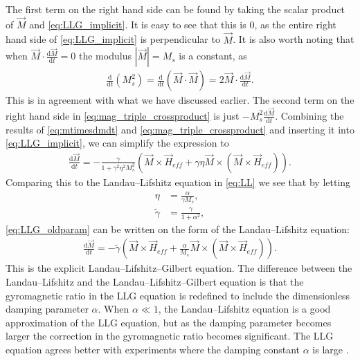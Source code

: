 \documentclass[12pt, a4paper, twoside, openright]{article}		%
\numberwithin{equation}{section}
\begin{document}
The first term on the right hand side can be found by taking the scalar product of $\vec{M}$ and \eqref{eq:LLG_implicit}. It is easy to see that this is 0, as the entire right hand side of \eqref{eq:LLG_implicit} is perpendicular to $\vec{M}$. It is also worth noting that when $\vec{M}\cdot \frac{\textrm{d} \vec{M}}{\textrm{d} t} = 0$ the modulus $|\vec{M}| = M_s$ is a constant, as 
\begin{align}
\frac{\textrm{d}}{\textrm{d} t} (M_s^2) = \frac{\textrm{d}}{\textrm{d} t} (\vec{M}\cdot\vec{M}) = 2 \vec{M} \cdot \frac{\textrm{d} \vec{M}}{\textrm{d} t}.
\end{align}
This is in agreement with what we have discussed earlier. The second term on the right hand side in \eqref{eq:mag_triple_crossproduct} is just $-M_s^2 \frac{\textrm{d} \vec{M}}{\textrm{d} t}$. Combining the results of \eqref{eq:mtimesdmdt} and \eqref{eq:mag_triple_crossproduct} and inserting it into \eqref{eq:LLG_implicit}, we can simplify the expression to
\begin{align}
\label{eq:LLG_oldparam}
\frac{\textrm{d} \vec{M}}{\textrm{d} t} = -\frac{\gamma}{1 + \gamma^2\eta^2 M_s^2}\left(\vec{M}\times\vec{H}_{eff} + \gamma\eta \vec{M} \times (\vec{M}\times\vec{H}_{eff})\right).
\end{align}
Comparing this to the Landau--Lifshitz equation in \eqref{eq:LL} we see that by letting
\begin{align}
\eta &= \frac{\alpha}{\gamma M_s}, \\
\tilde{\gamma} &= \frac{\gamma}{1+\alpha^2},
\end{align}
\eqref{eq:LLG_oldparam} can be written on the form of the Landau--Lifshitz equation:
\begin{align}
\label{eq:LLG}
\frac{\textrm{d} \vec{M}}{\textrm{d} t} = -\tilde{\gamma} \left(\vec{M} \times \vec{H}_{eff} + \frac{\alpha}{M_s} \vec{M}\times(\vec{M}\times\vec{H}_{eff})\right).
\end{align}
This is the explicit Landau--Lifshitz--Gilbert equation. The difference between the Landau--Lifshitz and the Landau--Lifshitz--Gilbert equation is that the gyromagnetic ratio in the LLG equation is redefined to include the dimensionless damping parameter $\alpha$. When $\alpha \ll 1$, the Landau--Lifshitz equation is a good approximation of the LLG equation, but as the damping parameter becomes larger the correction in the gyromagnetic ratio becomes significant. The LLG equation agrees better with experiments where the damping constant $\alpha$ is large \cite{GilbertKelly1955}.
\end{document}
